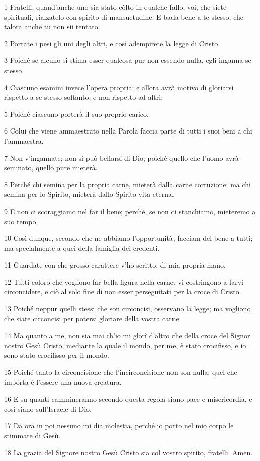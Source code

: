 \par 1 Fratelli, quand'anche uno sia stato còlto in qualche fallo, voi, che siete spirituali, rialzatelo con spirito di mansuetudine. E bada bene a te stesso, che talora anche tu non sii tentato.
\par 2 Portate i pesi gli uni degli altri, e così adempirete la legge di Cristo.
\par 3 Poiché se alcuno si stima esser qualcosa pur non essendo nulla, egli inganna se stesso.
\par 4 Ciascuno esamini invece l'opera propria; e allora avrà motivo di gloriarsi rispetto a se stesso soltanto, e non rispetto ad altri.
\par 5 Poiché ciascuno porterà il suo proprio carico.
\par 6 Colui che viene ammaestrato nella Parola faccia parte di tutti i suoi beni a chi l'ammaestra.
\par 7 Non v'ingannate; non si può beffarsi di Dio; poiché quello che l'uomo avrà seminato, quello pure mieterà.
\par 8 Perché chi semina per la propria carne, mieterà dalla carne corruzione; ma chi semina per lo Spirito, mieterà dallo Spirito vita eterna.
\par 9 E non ci scoraggiamo nel far il bene; perché, se non ci stanchiamo, mieteremo a suo tempo.
\par 10 Così dunque, secondo che ne abbiamo l'opportunità, facciam del bene a tutti; ma specialmente a quei della famiglia dei credenti.
\par 11 Guardate con che grosso carattere v'ho scritto, di mia propria mano.
\par 12 Tutti coloro che vogliono far bella figura nella carne, vi costringono a farvi circoncidere, e ciò al solo fine di non esser perseguitati per la croce di Cristo.
\par 13 Poiché neppur quelli stessi che son circoncisi, osservano la legge; ma vogliono che siate circoncisi per potersi gloriare della vostra carne.
\par 14 Ma quanto a me, non sia mai ch'io mi glorî d'altro che della croce del Signor nostro Gesù Cristo, mediante la quale il mondo, per me, è stato crocifisso, e io sono stato crocifisso per il mondo.
\par 15 Poiché tanto la circoncisione che l'incirconcisione non son nulla; quel che importa è l'essere una nuova creatura.
\par 16 E su quanti cammineranno secondo questa regola siano pace e misericordia, e così siano sull'Israele di Dio.
\par 17 Da ora in poi nessuno mi dia molestia, perché io porto nel mio corpo le stimmate di Gesù.
\par 18 La grazia del Signore nostro Gesù Cristo sia col vostro spirito, fratelli. Amen.


